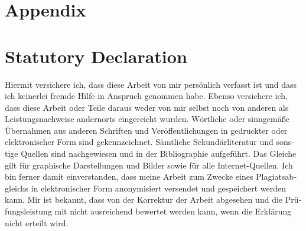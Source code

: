\documentclass[11pt, a4paper]{article} %
\begin{document}


\newpage %
\section*{Appendix} %

\blindtext %

\newpage %
\thispagestyle{empty} %
\section*{Statutory Declaration} %

\begin{otherlanguage}{german}
Hiermit versichere ich, dass diese Arbeit von mir pers\"{o}nlich verfasst ist und dass ich keinerlei fremde Hilfe in Anspruch genommen habe. Ebenso versichere ich, dass diese Arbeit oder Teile daraus weder von mir selbst noch von anderen als Leistungsnachweise andernorts eingereicht wurden. W\"{o}rtliche oder sinngem\"{a}{\ss}e \"{U}bernahmen aus anderen Schriften und Ver\"{o}ffentlichungen in gedruckter oder elektronischer Form sind gekennzeichnet. S\"{a}mtliche Sekund\"{a}rliteratur und sonstige Quellen sind nachgewiesen und in der Bibliographie aufgef\"{u}hrt. Das Gleiche gilt f\"{u}r graphische Darstellungen und Bilder sowie f\"{u}r alle Internet-Quellen. Ich bin ferner damit einverstanden, dass meine Arbeit zum Zwecke eines Plagiatsabgleichs in elektronischer Form anonymisiert versendet und gespeichert werden kann. Mir ist bekannt, dass von der Korrektur der Arbeit abgesehen und die Pr\"{u}fungsleistung mit nicht ausreichend bewertet werden kann, wenn die Erkl\"{a}rung nicht erteilt wird.
\end{otherlanguage}
\end{document}
